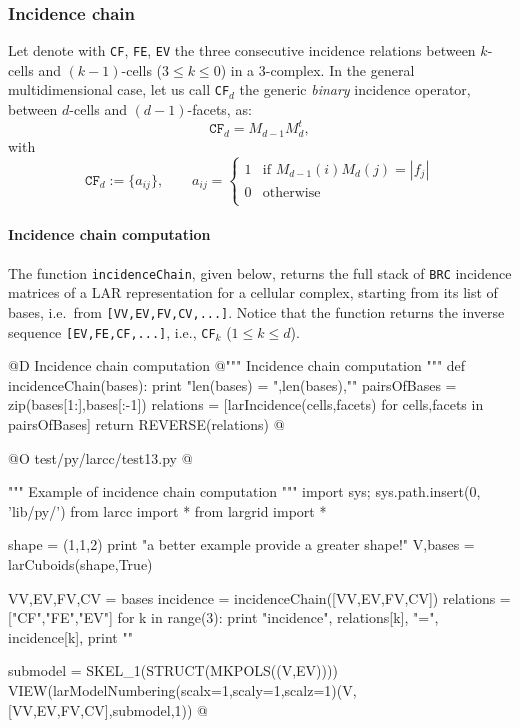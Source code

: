 \documentclass[11pt,oneside]{article}	%
\begin{document}
\subsubsection{Incidence chain}

Let denote with \texttt{CF}, \texttt{FE}, \texttt{EV} the three consecutive incidence relations between $k$-cells and $(k-1)$-cells ($3\leq k\leq 0$) in a 3-complex. In the general multidimensional case, let us call \texttt{CF}$_d$  the generic \emph{binary} incidence operator, between $d$-cells and $(d-1)$-facets, as:
\[
\texttt{CF}_d = M_{d-1} M_d^t, 
\]
with
\[
\texttt{CF}_d := \{a_{ij}\}, \qquad a_{ij} = 
\left\{
\begin{array}{cl}
1 & \mbox{if\ } M_{d-1}(i) M_d(j) = |f_j|  \\
0 & \mbox{otherwise}  \\  
\end{array}
\right.
\]

\paragraph{Incidence chain computation}
The function \texttt{incidenceChain}, given below, returns the full stack of \texttt{BRC} incidence matrices of a LAR representation for a cellular complex, starting from its list of bases, i.e.~from \texttt{[VV,EV,FV,CV,...]}. Notice that the function returns the inverse sequence 
\texttt{[EV,FE,CF,...]}, i.e., \texttt{CF}$_k$ ($1\leq k\leq d$).

@D Incidence chain computation
@{""" Incidence chain computation """
def incidenceChain(bases):
	print "\n len(bases) = ",len(bases),"\n"
	pairsOfBases = zip(bases[1:],bases[:-1])
	relations = [larIncidence(cells,facets) 
					for cells,facets in pairsOfBases]
	return REVERSE(relations)
@}

@O test/py/larcc/test13.py
@{""" Example of incidence chain computation """
import sys; sys.path.insert(0, 'lib/py/')
from larcc import *
from largrid import *

shape = (1,1,2) 
print "\n\nFor a better example provide a greater shape!"
V,bases = larCuboids(shape,True)

VV,EV,FV,CV = bases
incidence = incidenceChain([VV,EV,FV,CV])
relations = ["CF","FE","EV"]
for k in range(3):
	print "\n\n incidence", relations[k], "=\n", incidence[k],
print "\n\n"

submodel = SKEL_1(STRUCT(MKPOLS((V,EV))))
VIEW(larModelNumbering(scalx=1,scaly=1,scalz=1)(V,[VV,EV,FV,CV],submodel,1))
@}
\end{document}
